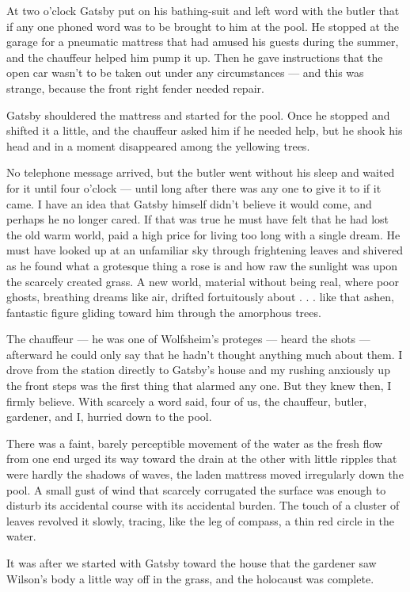 \documentclass{znotebook}
\begin{document}
At two o’clock Gatsby put on his bathing-suit and left word with the butler that if any one phoned word was to be brought to him at the pool. He stopped at the garage for a pneumatic mattress that had amused his guests during the summer, and the chauffeur helped him pump it up. Then he gave instructions that the open car wasn’t to be taken out under any circumstances — and this was strange, because the front right fender needed repair.

Gatsby shouldered the mattress and started for the pool. Once he stopped and shifted it a little, and the chauffeur asked him if he needed help, but he shook his head and in a moment disappeared among the yellowing trees.

No telephone message arrived, but the butler went without his sleep and waited for it until four o’clock — until long after there was any one to give it to if it came. I have an idea that Gatsby himself didn’t believe it would come, and perhaps he no longer cared. If that was true he must have felt that he had lost the old warm world, paid a high price for living too long with a single dream. He must have looked up at an unfamiliar sky through frightening leaves and shivered as he found what a grotesque thing a rose is and how raw the sunlight was upon the scarcely created grass. A new world, material without being real, where poor ghosts, breathing dreams like air, drifted fortuitously about . . . like that ashen, fantastic figure gliding toward him through the amorphous trees.

The chauffeur — he was one of Wolfsheim’s proteges — heard the shots — afterward he could only say that he hadn’t thought anything much about them. I drove from the station directly to Gatsby’s house and my rushing anxiously up the front steps was the first thing that alarmed any one. But they knew then, I firmly believe. With scarcely a word said, four of us, the chauffeur, butler, gardener, and I, hurried down to the pool.

There was a faint, barely perceptible movement of the water as the fresh flow from one end urged its way toward the drain at the other with little ripples that were hardly the shadows of waves, the laden mattress moved irregularly down the pool. A small gust of wind that scarcely corrugated the surface was enough to disturb its accidental course with its accidental burden. The touch of a cluster of leaves revolved it slowly, tracing, like the leg of compass, a thin red circle in the water.

It was after we started with Gatsby toward the house that the gardener saw Wilson’s body a little way off in the grass, and the holocaust was complete.
\end{document}
